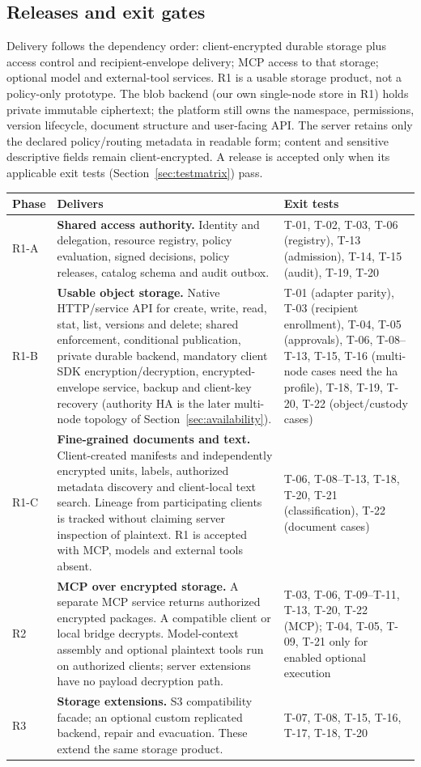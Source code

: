\subsection{Releases and exit gates}\label{sec:releases}
Delivery follows the dependency order: client-encrypted durable storage plus access control and recipient-envelope delivery; MCP access to that storage; optional model and external-tool services. R1 is a usable storage product, not a policy-only prototype. The blob backend (our own single-node store in R1) holds private immutable ciphertext; the platform still owns the namespace, permissions, version lifecycle, document structure and user-facing API. The server retains only the declared policy/routing metadata in readable form; content and sensitive descriptive fields remain client-encrypted. A release is accepted only when its applicable exit tests (Section~\ref{sec:testmatrix}) pass.
\begin{longtable}{@{}P{0.08\textwidth}P{0.50\textwidth}P{0.30\textwidth}@{}}
\toprule Phase & Delivers & Exit tests\\\midrule\endhead
R1-A & \textbf{Shared access authority.} Identity and delegation, resource registry, policy evaluation, signed decisions, policy releases, catalog schema and audit outbox. & T-01, T-02, T-03, T-06 (registry), T-13 (admission), T-14, T-15 (audit), T-19, T-20\\
R1-B & \textbf{Usable object storage.} Native HTTP/service API for create, write, read, stat, list, versions and delete; shared enforcement, conditional publication, private durable backend, mandatory client SDK encryption/decryption, encrypted-envelope service, backup and client-key recovery (authority HA is the later multi-node topology of Section~\ref{sec:availability}). & T-01 (adapter parity), T-03 (recipient enrollment), T-04, T-05 (approvals), T-06, T-08--T-13, T-15, T-16 (multi-node cases need the ha profile), T-18, T-19, T-20, T-22 (object/custody cases)\\
R1-C & \textbf{Fine-grained documents and text.} Client-created manifests and independently encrypted units, labels, authorized metadata discovery and client-local text search. Lineage from participating clients is tracked without claiming server inspection of plaintext. R1 is accepted with MCP, models and external tools absent. & T-06, T-08--T-13, T-18, T-20, T-21 (classification), T-22 (document cases)\\
R2 & \textbf{MCP over encrypted storage.} A separate MCP service returns authorized encrypted packages. A compatible client or local bridge decrypts. Model-context assembly and optional plaintext tools run on authorized clients; server extensions have no payload decryption path. & T-03, T-06, T-09--T-11, T-13, T-20, T-22 (MCP); T-04, T-05, T-09, T-21 only for enabled optional execution\\
R3 & \textbf{Storage extensions.} S3 compatibility facade; an optional custom replicated backend, repair and evacuation. These extend the same storage product. & T-07, T-08, T-15, T-16, T-17, T-18, T-20\\
\bottomrule
\end{longtable}
